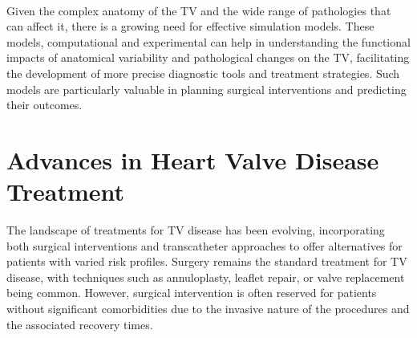 \\
Given the complex anatomy of the \gls{TV} and the wide range of pathologies that can affect it, there is a growing need for effective simulation models. These models, computational and experimental can help in understanding the functional impacts of anatomical variability and pathological changes on the \gls{TV}, facilitating the development of more precise diagnostic tools and treatment strategies. Such models are particularly valuable in planning surgical interventions and predicting their outcomes.

\section{Advances in Heart Valve Disease Treatment}
The landscape of treatments for \gls{TV} disease has been evolving, incorporating both surgical interventions and transcatheter approaches to offer alternatives for patients with varied risk profiles. Surgery remains the standard treatment for \gls{TV} disease, with techniques such as annuloplasty, leaflet repair, or valve replacement being common. However, surgical intervention is often reserved for patients without significant comorbidities due to the invasive nature of the procedures and the associated recovery times.

